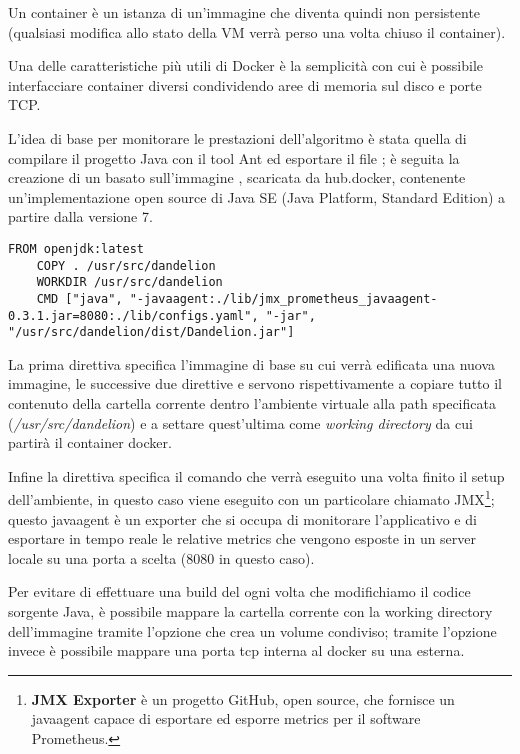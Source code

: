 Un container è un istanza di un'immagine che diventa quindi non persistente (qualsiasi modifica allo stato della VM verrà perso una volta chiuso il container). 

Una delle caratteristiche più utili di Docker è la semplicità con cui è possibile interfacciare container diversi condividendo aree di memoria sul disco e porte TCP.

L'idea di base per monitorare le prestazioni dell'algoritmo è stata quella di compilare il progetto Java con il tool Ant\cite{ant} ed esportare il file ; 
è seguita la creazione di un  basato sull'immagine \cite{open-jdk}, 
scaricata da hub.docker\cite{hub-docker}, contenente un'implementazione open source di Java SE (Java Platform, Standard Edition) a partire dalla versione 7. 

\begin{lstlisting}[style=YmlStyle, caption=Dockerfile]
    FROM openjdk:latest
    COPY . /usr/src/dandelion
    WORKDIR /usr/src/dandelion
    CMD ["java", "-javaagent:./lib/jmx_prometheus_javaagent-0.3.1.jar=8080:./lib/configs.yaml", "-jar", "/usr/src/dandelion/dist/Dandelion.jar"]
\end{lstlisting}

La prima direttiva  specifica l'immagine di base su cui verrà edificata una nuova immagine, le successive due direttive  e  servono rispettivamente a copiare 
tutto il contenuto della cartella corrente dentro l'ambiente virtuale alla path specificata (\textit{/usr/src/dandelion}) e a settare quest'ultima come \textit{working directory} da cui 
partirà il container docker. 

Infine la direttiva  specifica il comando che verrà eseguito una volta finito il setup dell'ambiente, in questo caso viene eseguito  con un particolare
 chiamato JMX\footnote{
    \textbf{JMX Exporter}\cite{jmx} è un progetto GitHub, open source, che fornisce un javaagent capace di esportare ed esporre metrics per il software 
    Prometheus\cite{prometheus}.
};
questo javaagent è un exporter che si occupa di monitorare l'applicativo e di esportare in tempo reale le relative metrics che vengono esposte in un server locale su una porta a scelta 
(8080 in questo caso).

Per evitare di effettuare una build del  ogni volta che modifichiamo il codice sorgente Java, è possibile mappare la cartella corrente con la working directory 
dell'immagine tramite l'opzione  che crea un volume condiviso; tramite l'opzione  invece è possibile mappare una porta tcp interna al docker su una esterna.

